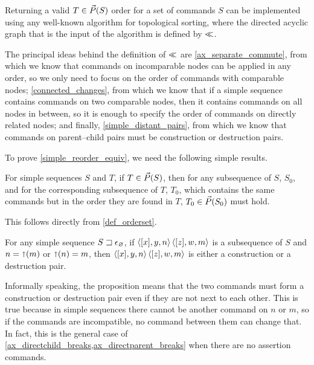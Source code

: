 Returning a valid $T\in\vec{P}({S})$ order for a set of commands $S$
can be implemented using any well-known algorithm for topological sorting,
where the directed acyclic graph that is the input of the algorithm is defined by $\ll$.

The principal ideas behind the definition of $\ll$ are 
\cref{ax_separate_commute}, from which we know that commands on incomparable
nodes can be applied in any order, so we only need to focus on the order of commands
with comparable nodes;
\cref{connected_changes}, from which we know that if a simple sequence contains commands on two comparable
nodes, then it contains commands on all nodes in between, so it is enough to specify
the order of commands on directly related nodes;
and finally, \cref{simple_distant_pairs}, from which we know
that commands on parent--child pairs must be construction or destruction pairs.

To prove \cref{simple_reorder_equiv}, we need the following simple results.

\begin{mycor}
For simple sequences $S$ and $T$,
if $T\in\vec{P}({S})$, then for any subsequence of $S$, $S_0$,
and for the corresponding subsequence of $T$, $T_0$, which
contains the same commands but in the order they are found in $T$,
$T_0\in\vec{P}({S_0})$ must hold.
\end{mycor}

This follows directly from \cref{def_orderset}.

\begin{mylem}
For any simple sequence ${S}\sqsupset\epsilon_\varnothing$,
if $\langle{[x],y,n}\rangle\,\langle{[z],w,m}\rangle$ is a subsequence of $S$ and $n=\mathord{\shortuparrow}(m)$ or $\mathord{\shortuparrow}(n)=m$,
then $\langle{[x],y,n}\rangle\,\langle{[z],w,m}\rangle$ is either a construction or a destruction pair.
\end{mylem}

Informally speaking, the proposition means that
the two commands must form a construction or destruction pair even
if they are not next to each other.
This is true because in simple sequences
there cannot be another command on $n$ or $m$,
so if the commands are incompatible, no command between them can change that.
In fact, this  is the general case
of \cref{ax_directchild_breaks,ax_directparent_breaks} when there are no assertion commands.

